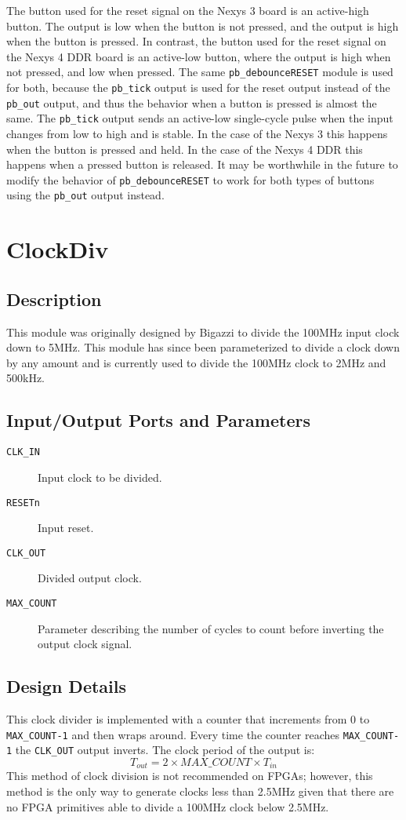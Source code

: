 The button used for the reset signal on the Nexys 3 board is an active-high button. The output is low when the button is not pressed, and the output is high when the button is pressed. In contrast, the button used for the reset signal on the Nexys 4 DDR board is an active-low button, where the output is high when not pressed, and low when pressed. The same \texttt{pb\_debounceRESET} module is used for both, because the \texttt{pb\_tick} output is used for the reset output instead of the \texttt{pb\_out} output, and thus the behavior when a button is pressed is almost the same. The \texttt{pb\_tick} output sends an active-low single-cycle pulse when the input changes from low to high and is stable. In the case of the Nexys 3 this happens when the button is pressed and held. In the case of the Nexys 4 DDR this happens when a pressed button is released. It may be worthwhile in the future to modify the behavior of \texttt{pb\_debounceRESET} to work for both types of buttons using the \texttt{pb\_out} output instead. %

\section{ClockDiv}
\subsection{Description}
This module was originally designed by Bigazzi to divide the 100MHz input clock down to 5MHz. This module has since been parameterized to divide a clock down by any amount and is currently used to divide the 100MHz clock to 2MHz and 500kHz.

\subsection{Input/Output Ports and Parameters}
\begin{description}
	\item[\texttt{CLK\_IN}] Input clock to be divided.
	\item[\texttt{RESETn}] Input reset.
	\item[\texttt{CLK\_OUT}] Divided output clock.
	\item[\texttt{MAX\_COUNT}] Parameter describing the number of cycles to count before inverting the output clock signal.
\end{description}

\subsection{Design Details}
This clock divider is implemented with a counter that increments from 0 to \texttt{MAX\_COU\-N\-T-1} and then wraps around. Every time the counter reaches \texttt{MAX\_COUNT-1} the \texttt{CLK\_OUT} output inverts. The clock period of the output is:
$$ T_{out} = 2 \times MAX\_COUNT \times T_{in} $$
This method of clock division is not recommended on FPGAs; however, this method is the only way to generate clocks less than 2.5MHz given that there are no FPGA primitives able to divide a 100MHz clock below 2.5MHz.


